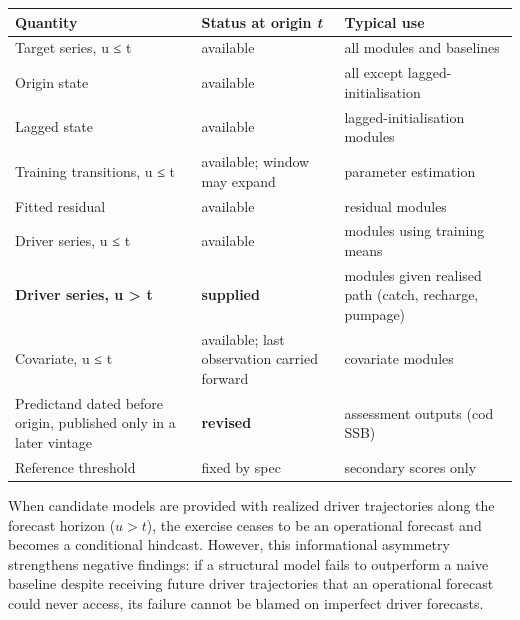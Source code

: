 \documentclass[11pt]{article}
\begin{document}
{\def\LTcaptype{none} %
\begin{longtable}[]{@{}
  >{\raggedright\arraybackslash}p{}
  >{\raggedright\arraybackslash}p{}
  >{\raggedright\arraybackslash}p{}@{}}
\toprule\noalign{}
\begin{minipage}[b]{\linewidth}\raggedright
Quantity
\end{minipage} & \begin{minipage}[b]{\linewidth}\raggedright
Status at origin \emph{t}
\end{minipage} & \begin{minipage}[b]{\linewidth}\raggedright
Typical use
\end{minipage} \\
\midrule\noalign{}
\endhead
\bottomrule\noalign{}
\endlastfoot
Target series, u ≤ t & available & all modules and baselines \\
Origin state & available & all except lagged-initialisation \\
Lagged state & available & lagged-initialisation modules \\
Training transitions, u ≤ t & available; window may expand & parameter
estimation \\
Fitted residual & available & residual modules \\
Driver series, u ≤ t & available & modules using training means \\
\textbf{Driver series, u \textgreater{} t} & \textbf{supplied} & modules
given realised path (catch, recharge, pumpage) \\
Covariate, u ≤ t & available; last observation carried forward &
covariate modules \\
Predictand dated before origin, published only in a later vintage &
\textbf{revised} & assessment outputs (cod SSB) \\
Reference threshold & fixed by spec & secondary scores only \\
\end{longtable}
}

When candidate models are provided with realized driver trajectories
along the forecast horizon (\(u > t\)), the exercise ceases to be an
operational forecast and becomes a conditional hindcast. However, this
informational asymmetry strengthens negative findings: if a structural
model fails to outperform a naive baseline despite receiving future
driver trajectories that an operational forecast could never access, its
failure cannot be blamed on imperfect driver forecasts.
\end{document}
